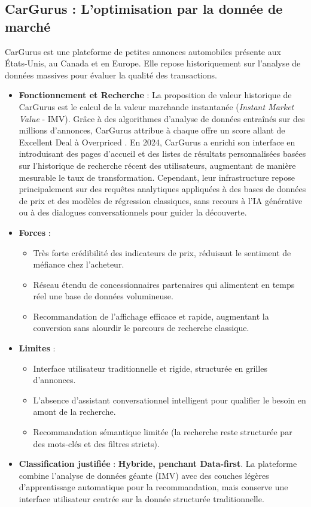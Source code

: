 \documentclass[11pt,a4paper]{article}
\begin{document}
\subsection{CarGurus : L'optimisation par la donnée de marché}
CarGurus est une plateforme de petites annonces automobiles présente aux États-Unis, au Canada et en Europe. Elle repose historiquement sur l'analyse de données massives pour évaluer la qualité des transactions.

\begin{itemize}
    \item \textbf{Fonctionnement et Recherche} : La proposition de valeur historique de CarGurus est le calcul de la valeur marchande instantanée (\textit{Instant Market Value} - IMV). Grâce à des algorithmes d'analyse de données entraînés sur des millions d'annonces, CarGurus attribue à chaque offre un score allant de \og Excellent Deal \fg à \og Overpriced \fg. En 2024, CarGurus a enrichi son interface en introduisant des pages d'accueil et des listes de résultats personnalisées basées sur l'historique de recherche récent des utilisateurs, augmentant de manière mesurable le taux de transformation. Cependant, leur infrastructure repose principalement sur des requêtes analytiques appliquées à des bases de données de prix et des modèles de régression classiques, sans recours à l'IA générative ou à des dialogues conversationnels pour guider la découverte.
    \item \textbf{Forces} :
    \begin{itemize}
        \item Très forte crédibilité des indicateurs de prix, réduisant le sentiment de méfiance chez l'acheteur.
        \item Réseau étendu de concessionnaires partenaires qui alimentent en temps réel une base de données volumineuse.
        \item Recommandation de l'affichage efficace et rapide, augmentant la conversion sans alourdir le parcours de recherche classique.
    \end{itemize}
    \item \textbf{Limites} :
    \begin{itemize}
        \item Interface utilisateur traditionnelle et rigide, structurée en grilles d'annonces.
        \item L'absence d'assistant conversationnel intelligent pour qualifier le besoin en amont de la recherche.
        \item Recommandation sémantique limitée (la recherche reste structurée par des mots-clés et des filtres stricts).
    \end{itemize}
    \item \textbf{Classification justifiée} : \textbf{Hybride, penchant Data-first}. La plateforme combine l'analyse de données géante (IMV) avec des couches légères d'apprentissage automatique pour la recommandation, mais conserve une interface utilisateur centrée sur la donnée structurée traditionnelle.
\end{itemize}
\end{document}
